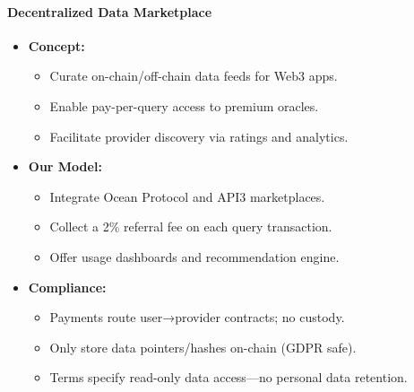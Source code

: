 \documentclass[13pt]{extarticle}
\begin{document}
\paragraph{Decentralized Data Marketplace}
\begin{itemize}[left=1em]
  \item \textbf{Concept:}
    \begin{itemize}[left=1.2em]
      \item Curate on-chain/off-chain data feeds for Web3 apps.
      \item Enable pay-per-query access to premium oracles.
      \item Facilitate provider discovery via ratings and analytics.
    \end{itemize}
  \item \textbf{Our Model:}
    \begin{itemize}[left=1.2em]
      \item Integrate Ocean Protocol and API3 marketplaces.
      \item Collect a 2\% referral fee on each query transaction.
      \item Offer usage dashboards and recommendation engine.
    \end{itemize}
  \item \textbf{Compliance:}
    \begin{itemize}[left=1.2em]
      \item Payments route user→provider contracts; no custody.
      \item Only store data pointers/hashes on-chain (GDPR safe).
      \item Terms specify read-only data access—no personal data retention.
    \end{itemize}
\end{itemize}
\end{document}
